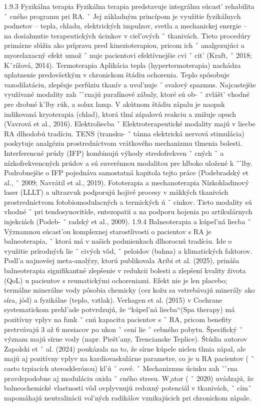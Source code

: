 { 1.9.3 Fyzikálna terapia Fyzikálna terapia predstavuje integrálnu súcast’ rehabilita ˇ cného programu pri RA. ˇ Jej základným princípom je využitie fyzikálnych podnetov – tepla, chladu, elektrických impulzov, svetla a mechanickej energie – na dosiahnutie terapeutických úcinkov v ciel’ových ˇ tkanivách. Tieto procedúry primárne slúžia ako príprava pred kinezioterapiou, pricom ich ˇ analgezujúci a myorelaxacný efekt umož ˇ nuje pacientovi efektívnejšie cvi ˇ cit’ (Kraft, ˇ 2018; Kˇrížová, 2014).
 Termoterapia Aplikácia tepla (hypertermoterapia) nachádza uplatnenie predovšetkým v chronickom štádiu ochorenia. Teplo spôsobuje vazodilatáciu, zlepšuje perfúziu tkanív a uvol’nuje ˇ svalový spazmus. Najcastejšie využívané modality zah ˇ  ́rnajú parafínové zábaly, ktoré sú ob- ˇ zvlášt’ vhodné pre drobné k ́lby rúk, a solux lamp. V akútnom štádiu zápalu je naopak indikovaná kryoterapia (chlad), ktorá tlmí zápalovú reakciu a znižuje opuch (Vavrová et al., 2016).
 Elektroliecba ˇ Elektroterapeutické modality majú v liecbe RA dlhodobú tradíciu. TENS (transku- ˇ tánna elektrická nervová stimulácia) poskytuje analgéziu prostredníctvom vrátkového mechanizmu tlmenia bolesti. Interferencné prúdy (IFP) kombinujú výhody stredofrekven ˇ cných ˇ a nízkofrekvencných prúdov a sú suverénnou modalitou pre hlboko uložené k ˇ  ́lby. Podrobnejšie o IFP pojednáva samostatná kapitola tejto práce (Podebradský et al., ˇ 2009; Navrátil et al., 2019).
 Fototerapia a mechanoterapia Nízkohladinový laser (LLLT) a ultrazvuk podporujú hojivé procesy v mäkkých tkanivách prostredníctvom fotobiomodulacných a termických ú ˇ cinkov. Tieto modality sú vhodné ˇ pri tendosynovitíde, entezopatii a na podporu hojenia po artikulárnych injekciách (Podeb- ˇ radský et al., 2009).
 1.9.4 Balneoterapia a kúpel’ná liecba ˇ Významnou súcast’ou komplexnej starostlivosti o pacientov s RA je balneoterapia, ˇ ktorá má v našich podmienkach dlhorocnú tradíciu. Ide o využitie prírodných lie ˇ civých vôd, ˇ peloidov (bahna) a klimatických faktorov. Podl’a najnovšej meta-analýzy, ktorú publikovala Aribi et al. (2025), prináša balneoterapia signifikantné zlepšenie v redukcii bolesti a zlepšení kvality života (QoL) u pacientov s reumatickými ochoreniami. Efekt nie je len placebo; termálne minerálne vody pôsobia chemicky (cez kožu sa vstrebávajú minerály ako síra, jód) a fyzikálne (teplo, vztlak). Verhagen et al. (2015) v Cochrane systematickom prehl’ade potvrdzujú, že ``kúpel’ná liecba``(Spa therapy) má pozitívny vplyv na funk ˇ cnú kapacitu pacientov s ˇ RA, pricom benefity pretrvávajú 3 až 6 mesiacov po ukon ˇ cení lie ˇ cebného pobytu. Špecifický ˇ význam majú sírne vody (napr. Piešt’any, Trencianske Teplice). Štúdia autorov Zapolski et ˇ al. (2024) poukázala na to, že sírne kúpele nielen tlmia zápal, ale majú aj pozitívny vplyv na kardiovaskulárne parametre, co je u RA pacientov ( ˇ casto trpiacich aterosklerózou) kl’ú ˇ cové. ˇ Mechanizmus úcinku zah ˇ  ́rna pravdepodobne aj moduláciu oxida ˇ cného stresu. W  ̨ator ( ˇ 2020) uvádzajú, že balneochemické vlastnosti vôd ovplyvnujú redoxný potenciál v tkanivách, ˇ címˇ napomáhajú neutralizácii vol’ných radikálov vznikajúcich pri chronickom zápale.
}
